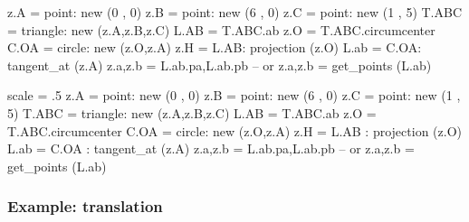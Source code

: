 \begin{minipage}{0.6\textwidth}
\begin{tkzexample}
\begin{tkzelements}
   z.A     = point: new (0 , 0)
   z.B     = point: new (6 , 0)
   z.C     = point: new (1 , 5)
   T.ABC   = triangle: new (z.A,z.B,z.C)
   L.AB    = T.ABC.ab
   z.O     = T.ABC.circumcenter
   C.OA    = circle: new (z.O,z.A)
   z.H     = L.AB: projection (z.O)
   L.ab    = C.OA: tangent_at (z.A)
   z.a,z.b = L.ab.pa,L.ab.pb
  -- or z.a,z.b  = get_points (L.ab)
\end{tkzelements}
\end{tkzexample}
\end{minipage}
\begin{minipage}{0.4\textwidth}
\begin{tkzelements}
scale   = .5
z.A     = point: new (0 , 0)
z.B     = point: new (6 , 0)
z.C     = point: new (1 , 5)
T.ABC   = triangle: new (z.A,z.B,z.C)
L.AB    = T.ABC.ab
z.O     = T.ABC.circumcenter
C.OA    = circle: new (z.O,z.A)
z.H     = L.AB : projection (z.O)
L.ab    = C.OA : tangent_at (z.A)
z.a,z.b = L.ab.pa,L.ab.pb
   -- or z.a,z.b  = get_points (L.ab)
\end{tkzelements}
\hspace*{\fill}
\hspace*{\fill}
\end{minipage}


\subsubsection{Example: translation} %
\label{ssub:example_translation}

